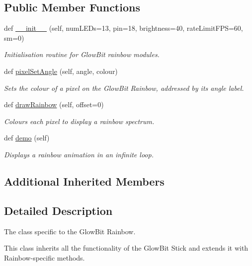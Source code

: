 \subsection*{Public Member Functions}
\begin{DoxyCompactItemize}
\item 
def \hyperlink{classglowbit_1_1rainbow_ab1af2d27c10f3ffba7b3ce955cb6229f}{\+\_\+\+\_\+init\+\_\+\+\_\+} (self, num\+L\+E\+Ds=13, pin=18, brightness=40, rate\+Limit\+F\+PS=60, sm=0)
\begin{DoxyCompactList}\small\item\em Initialisation routine for Glow\+Bit rainbow modules. \end{DoxyCompactList}\item 
def \hyperlink{classglowbit_1_1rainbow_a0940825ae934617f95b96e472923f07a}{pixel\+Set\+Angle} (self, angle, colour)
\begin{DoxyCompactList}\small\item\em Sets the colour of a pixel on the Glow\+Bit Rainbow, addressed by its angle label. \end{DoxyCompactList}\item 
def \hyperlink{classglowbit_1_1rainbow_af03e480ce6a5d27780268b242a3fdfa7}{draw\+Rainbow} (self, offset=0)
\begin{DoxyCompactList}\small\item\em Colours each pixel to display a rainbow spectrum. \end{DoxyCompactList}\item 
def \hyperlink{classglowbit_1_1rainbow_ae693f9ccb27c683ee6d69728e8f9266f}{demo} (self)
\begin{DoxyCompactList}\small\item\em Displays a rainbow animation in an infinite loop. \end{DoxyCompactList}\end{DoxyCompactItemize}
\subsection*{Additional Inherited Members}


\subsection{Detailed Description}
The class specific to the Glow\+Bit Rainbow. 

This class inherits all the functionality of the Glow\+Bit Stick and extends it with Rainbow-\/specific methods. 

